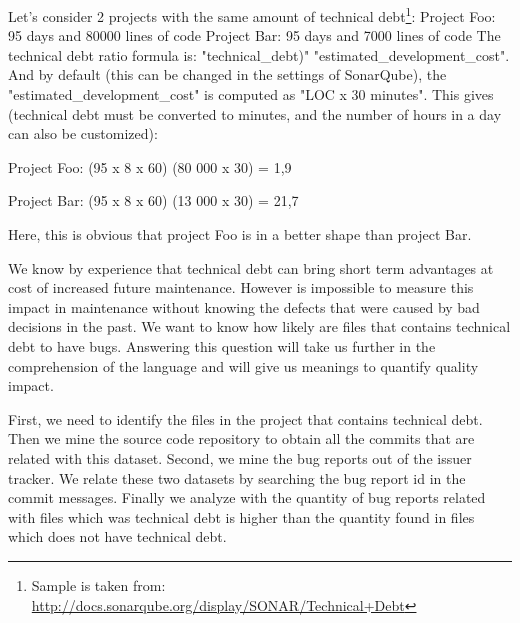 Let's consider 2 projects with the same amount of technical debt\footnote{Sample is taken from: \url{ http://docs.sonarqube.org/display/SONAR/Technical+Debt}}:
Project Foo: 95 days and 80000 lines of code
Project Bar: 95 days and 7000 lines of code
The technical debt ratio formula is: "technical\_debt)" \/ "estimated\_development\_cost". And by default (this can be changed in the settings of SonarQube), the "estimated\_development\_cost" is computed as "LOC x 30 minutes". This gives (technical debt must be converted to minutes, and the number of hours in a day can also be customized):
\par
Project Foo: (95 x 8 x 60) \/ (80 000 x 30) = 1,9%
\par
Project Bar: (95 x 8 x 60) \/ (13 000 x 30) = 21,7%
\par
Here, this is obvious that project Foo is in a better shape than project Bar.

\noindent{\rqiii}

 We know by experience that technical debt can bring short term advantages at cost of increased future maintenance. However is impossible to measure this impact in maintenance without knowing the defects that were caused by bad decisions in the past. We want to know how likely are files that contains technical debt to have bugs. Answering this question will take us further in the comprehension of the language and will give us meanings to quantify quality impact. 


 First, we need to identify the files in the project that contains technical debt. Then we mine the source code repository to obtain all the commits that are related with this dataset. Second, we mine the bug reports out of the issuer tracker. We relate these two datasets by searching the bug report id in  the commit messages. Finally we analyze with the quantity of bug reports related with files which was technical debt is higher than the quantity found in files which does not have technical debt. 